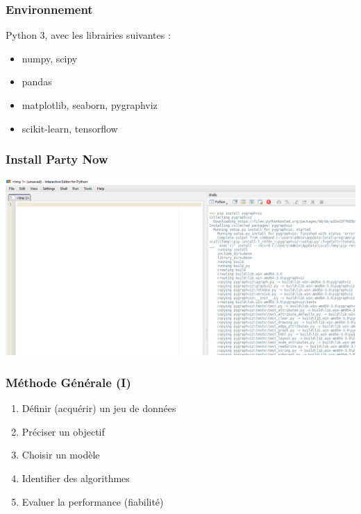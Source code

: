 \documentclass[11pt]{beamer}
\newenvironment{slide}[1]{%
\begin{frame}[environment=slide]
\frametitle{#1}
}{%
\end{frame}
}
\begin{document}
\begin{slide}{Environnement}
Python 3, avec les librairies suivantes :\\

\begin{itemize}
	\item numpy, scipy
	\item pandas
	\item matplotlib, seaborn, pygraphviz
	\item scikit-learn, tensorflow
\end{itemize}	
	
\end{slide}

\begin{slide}{Install Party Now}

\includegraphics[scale=0.25]{pyzo}

\end{slide}

\begin{slide}{Méthode Générale (I)}

\begin{enumerate}

\item Définir (acquérir) un jeu de données
\pause
\item Préciser un objectif
\pause
\item Choisir un modèle
\pause
\item Identifier des algorithmes
\pause
\item Evaluer la performance (fiabilité)

\end{enumerate}

\end{slide}
\end{document}
